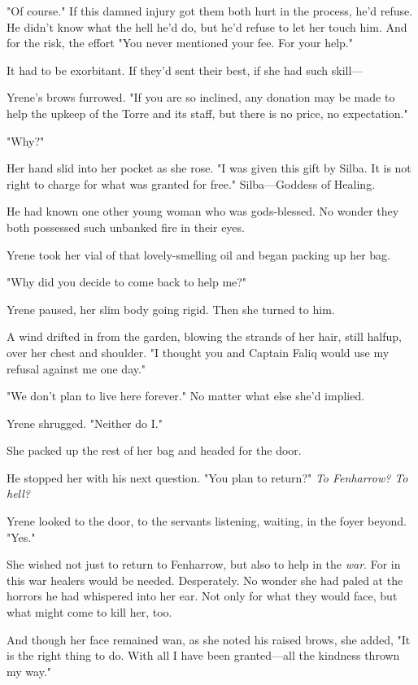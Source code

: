 "Of course." If this damned injury got them both hurt in the process, he'd refuse. He didn't know what the hell he'd do, but he'd refuse to let her touch him. And for the risk, the effort  "You never mentioned your fee. For your help."

It had to be exorbitant. If they'd sent their best, if she had such skill---

Yrene's brows furrowed. "If you are so inclined, any donation may be made to help the upkeep of the Torre and its staff, but there is no price, no expectation."

"Why?"

Her hand slid into her pocket as she rose. "I was given this gift by Silba. It is not right to charge for what was granted for free." Silba---Goddess of Healing.

He had known one other young woman who was gods-blessed. No wonder they both possessed such unbanked fire in their eyes.

Yrene took her vial of that lovely-smelling oil and began packing up her bag.

"Why did you decide to come back to help me?"

Yrene paused, her slim body going rigid. Then she turned to him.

A wind drifted in from the garden, blowing the strands of her hair, still halfup, over her chest and shoulder. "I thought you and Captain Faliq would use my refusal against me one day."

"We don't plan to live here forever." No matter what else she'd implied.

Yrene shrugged. "Neither do I."

She packed up the rest of her bag and headed for the door.

He stopped her with his next question. "You plan to return?" \emph{To Fenharrow? To hell?}

Yrene looked to the door, to the servants listening, waiting, in the foyer beyond. "Yes."

She wished not just to return to Fenharrow, but also to help in the
\emph{war}. For in this war healers would be needed. Desperately. No wonder she had paled at the horrors he had whispered into her ear. Not only for what they would face, but what might come to kill her, too.

And though her face remained wan, as she noted his raised brows, she added, "It is the right thing to do. With all I have been granted---all the kindness thrown my way."

